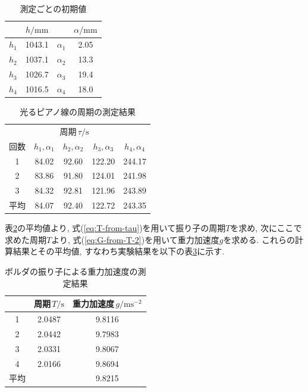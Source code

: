 \documentclass{jarticle}
\begin{document}
\begin{table}[h]
  \centering
  \caption{測定ごとの初期値}
  \begin{tabular}{cc|cc}
    \hline
    & $h/\mathrm{mm}$ & & $\alpha/\mathrm{mm}$ \\
    \hline
    $h_1$ & 1043.1 & $\alpha_1$ & 2.05 \\
    $h_2$ & 1037.1 & $\alpha_2$ & 13.3 \\
    $h_3$ & 1026.7 & $\alpha_3$ & 19.4 \\
    $h_4$ & 1016.5 & $\alpha_4$ & 18.0 \\
    \hline
  \end{tabular}
  \label{tb:initial-value-2}
\end{table}

\begin{table}[h]
  \centering
  \caption{光るピアノ線の周期の測定結果}
  \begin{tabular}{ccccc}
    \hline
     & \multicolumn{3}{c}{周期\,$\tau/\mathrm{s}$} \\
    回数 & $h_1,\alpha_1$ & $h_2,\alpha_2$ & $h_3,\alpha_3$ & $h_4,\alpha_4$ \\
    \hline
    1 & 84.02 & 92.60 & 122.20 & 244.17 \\
    2 & 83.86 & 91.80 & 124.01 & 241.98 \\
    3 & 84.32 & 92.81 & 121.96 & 243.89 \\
    \hline
    平均 & 84.07 & 92.40 & 122.72 & 243.35 \\
    \hline
  \end{tabular}
  \label{tb:measure-result}
\end{table}

表\ref{tb:measure-result}の平均値より, 式(\ref{eq:T-from-tau})を用いて振り子の周期$T$を求め, 次にここで求めた周期$T$より, 式(\ref{eq:G-from-T-2})を用いて重力加速度$g$を求める. これらの計算結果とその平均値, すなわち実験結果を以下の表\ref{tb:experiment-result}に示す. 

\begin{table}[H]
  \centering
  \caption{ボルダの振り子による重力加速度の測定結果}
  \begin{tabular}{ccc}
    \hline
    & 周期\,$T/\mathrm{s}$ & 重力加速度\,$g/\mathrm{ms^{-2}}$\\
    \hline
    1 & 2.0487 & 9.8116 \\
    2 & 2.0442 & 9.7983 \\
    3 & 2.0331 & 9.8067 \\
    4 & 2.0166 & 9.8694 \\
    \hline
    平均 & & 9.8215 \\
    \hline
  \end{tabular}
  \label{tb:experiment-result}
\end{table}
\end{document}
